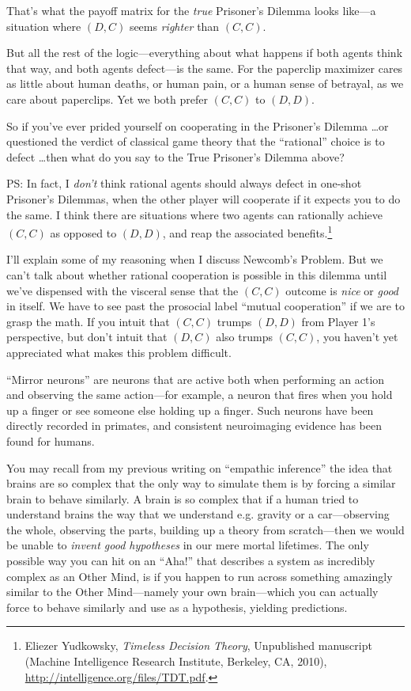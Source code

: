 {
 That's what the payoff matrix for the
\textit{true} Prisoner's Dilemma looks like---a
situation where $(D,C)$ seems \textit{righter} than $(C,C)$.}

{
 But all the rest of the logic---everything about what happens if
both agents think that way, and both agents defect---is the same. For
the paperclip maximizer cares as little about human deaths, or human
pain, or a human sense of betrayal, as we care about paperclips. Yet we
both prefer $(C,C)$ to $(D,D)$.}

{
 So if you've ever prided yourself on cooperating
in the Prisoner's Dilemma \ldots or questioned the
verdict of classical game theory that the
``rational'' choice is to defect
\ldots then what do you say to the True Prisoner's
Dilemma above?}

{
 PS: In fact, I \textit{don't} think rational
agents should always defect in one-shot Prisoner's
Dilemmas, when the other player will cooperate if it expects you to do
the same. I think there are situations where two agents can rationally
achieve $(C,C)$ as opposed to $(D,D)$, and reap the associated
benefits.\footnote{Eliezer Yudkowsky, \textit{Timeless Decision Theory},
Unpublished manuscript (Machine Intelligence Research Institute,
Berkeley, CA, 2010), \url{http://intelligence.org/files/TDT.pdf}.}}

{
 I'll explain some of my reasoning when I discuss
Newcomb's Problem. But we can't talk
about whether rational cooperation is possible in this dilemma until
we've dispensed with the visceral sense that the $(C,C)$
outcome is \textit{nice} or \textit{good} in itself. We have to see
past the prosocial label ``mutual
cooperation'' if we are to grasp the math. If you
intuit that $(C,C)$ trumps $(D,D)$ from Player 1's
perspective, but don't intuit that $(D,C)$ also trumps
$(C,C)$, you haven't yet appreciated what makes this
problem difficult.}

\myendsectiontext


{
 ``Mirror neurons'' are neurons
that are active both when performing an action and observing the same
action---for example, a neuron that fires when you hold up a finger or
see someone else holding up a finger. Such neurons have been directly
recorded in primates, and consistent neuroimaging evidence has been
found for humans. }

{
 You may recall from my previous writing on
``empathic inference'' the idea that
brains are so complex that the only way to simulate them is by forcing
a similar brain to behave similarly. A brain is so complex that if a
human tried to understand brains the way that we understand e.g.
gravity or a car---observing the whole, observing the parts, building
up a theory from scratch---then we would be unable to \textit{invent
good hypotheses} in our mere mortal lifetimes. The only possible way
you can hit on an ``Aha!'' that
describes a system as incredibly complex as an Other Mind, is if you
happen to run across something amazingly similar to the Other
Mind---namely your own brain---which you can actually force to behave
similarly and use as a hypothesis, yielding predictions.}

